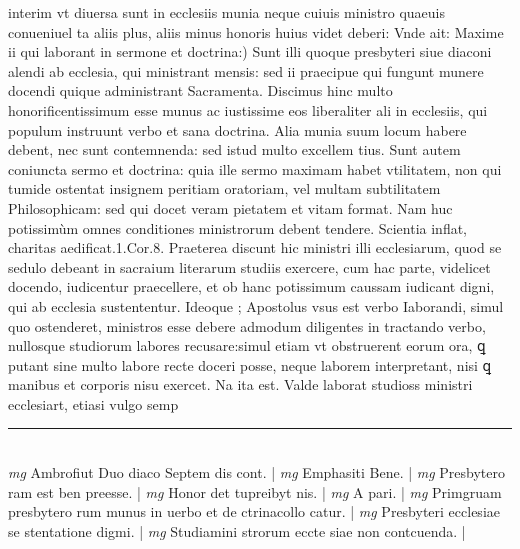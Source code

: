 \documentclass{article}
\begin{document}
\begin{pages}
interim vt diuersa sunt in ecclesiis munia neque cuiuis ministro quaeuis conueniuel ta aliis plus, aliis minus honoris huius videt deberi: Vnde ait:  \pend\pstart Maxime ii qui laborant in sermone et doctrina:) Sunt illi quoque presbyteri siue diaconi alendi ab ecclesia, qui ministrant mensis: sed ii praecipue qui fungunt munere docendi quique administrant Sacramenta. Discimus hinc multo honorificentissimum esse munus ac iustissime eos liberaliter ali in ecclesiis, qui populum instruunt verbo et sana doctrina. Alia munia suum locum habere debent, nec sunt contemnenda: sed istud multo excellem tius. Sunt autem coniuncta sermo et doctrina: quia ille sermo maximam habet vtilitatem, non qui tumide ostentat insignem peritiam oratoriam, vel multam subtilitatem Philosophicam: sed qui docet veram pietatem et vitam format. Nam huc potissimùm omnes conditiones ministrorum debent tendere. Scientia inflat, charitas aedificat.1.Cor.8. Praeterea discunt hic ministri illi ecclesiarum, quod se sedulo debeant in sacraium literarum studiis exercere, cum hac parte, videlicet docendo, iudicentur praecellere, et ob hanc potissimum caussam iudicant digni, qui ab ecclesia sustententur. Ideoque ; Apostolus vsus est verbo Iaborandi, simul quo ostenderet, ministros esse debere admodum diligentes in tractando verbo, nullosque studiorum labores recusare:simul etiam vt obstruerent eorum ora, ꝗ putant sine multo labore recte doceri posse, neque laborem interpretant, nisi ꝗ manibus et corporis nisu exercet. Na ita est. Valde laborat studioss ministri ecclesiart, etiasi vulgo semp  \pend
\vspace{0.5cm}\noindent
\vspace{0.2cm}\rule{1cm}{0.2pt}\\ 
\hspace{0.2cm}\textit{mg}
\footnotesize Ambrofiut Duo diaco Septem dis cont. 
\normalsize| 
\hspace{0.2cm}\textit{mg}
\footnotesize Emphasiti Bene. 
\normalsize| 
\hspace{0.2cm}\textit{mg}
\footnotesize Presbytero ram est ben preesse. 
\normalsize| 
\hspace{0.2cm}\textit{mg}
\footnotesize Honor det tupreibyt nis. 
\normalsize| 
\hspace{0.2cm}\textit{mg}
\footnotesize A pari. 
\normalsize| 
\hspace{0.2cm}\textit{mg}
\footnotesize Primgruam presbytero rum munus in uerbo et de ctrinacollo catur. 
\normalsize| 
\hspace{0.2cm}\textit{mg}
\footnotesize Presbyteri ecclesiae se stentatione digmi. 
\normalsize| 
\hspace{0.2cm}\textit{mg}
\footnotesize Studiamini strorum eccte siae non contcuenda. 
\normalsize| 

\end{pages}
\end{document}
